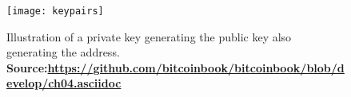 \begin{figure}[!htbp]
    \centering
    \texttt{[image: keypairs]}
    \caption[Illustration of a private key generating the public key also generating the address]
    {Illustration of a private key generating the public key also generating the address. \\ \textbf{Source:\url{https://github.com/bitcoinbook/bitcoinbook/blob/develop/ch04.asciidoc}}}
    \label{fig:keypairs}
\end{figure}
    